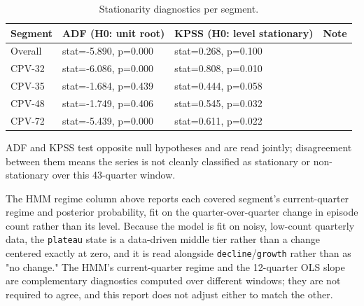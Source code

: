 \documentclass[11pt,a4paper]{article}
\newcommand{\code}[1]{\texttt{#1}}
\begin{document}
\begin{table}[H]
\centering
\small
\begin{tabularx}{\textwidth}{lXXl}
\toprule
Segment & ADF (H0: unit root) & KPSS (H0: level stationary) & Note \\
\midrule
Overall & stat=-5.890, p=0.000 & stat=0.268, p=0.100 &  \\
CPV-32 & stat=-6.086, p=0.000 & stat=0.808, p=0.010 &  \\
CPV-35 & stat=-1.684, p=0.439 & stat=0.444, p=0.058 &  \\
CPV-48 & stat=-1.749, p=0.406 & stat=0.545, p=0.032 &  \\
CPV-72 & stat=-5.439, p=0.000 & stat=0.611, p=0.022 &  \\
\bottomrule
\end{tabularx}
\caption{Stationarity diagnostics per segment.}
\end{table}
ADF and KPSS test opposite null hypotheses and are read jointly; disagreement
between them means the series is not cleanly classified as stationary or
non-stationary over this 43-quarter window.

The HMM regime column above reports each covered segment's current-quarter
regime and posterior probability, fit on the quarter-over-quarter change in
episode count rather than its level. Because the model is fit on noisy,
low-count quarterly data, the \code{plateau} state is a data-driven middle
tier rather than a change centered exactly at zero, and it is read alongside
\code{decline}/\code{growth} rather than as "no change." The HMM's
current-quarter regime and the 12-quarter OLS slope are complementary
diagnostics computed over different windows; they are not required to agree,
and this report does not adjust either to match the other.
\end{document}
